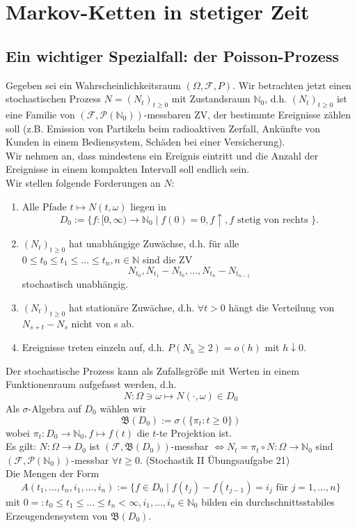 \documentclass[a4paper,twoside,DIV15,BCOR12mm]{scrbook}
\newcommand{\cF}{\mathcal F}
\newcommand{\borel}{{\mathfrak B}}
\begin{document}
\chapter{Markov-Ketten in stetiger Zeit}

\section{Ein wichtiger Spezialfall: der Poisson-Prozess}

Gegeben sei ein Wahrscheinlichkeitsraum $(\Omega,\cF,P)$.
Wir betrachten jetzt einen stochastischen Prozess $N=(N_t)_{t\geq 0}$
mit Zustandsraum $\mathbb{N}_0$, d.h. $(N_t)_{t\geq 0}$ ist eine Familie von
$(\cF,\mathcal{P}(\mathbb{N}_0))$-messbaren ZV, der bestimmte Ereignisse zählen soll
(z.B. Emission von Partikeln beim radioaktiven Zerfall, Ankünfte von Kunden in einem
Bediensystem, Schäden bei einer Versicherung). \\
Wir nehmen an, dass mindestens ein Ereignis eintritt und die Anzahl der Ereignisse in einem
kompakten Intervall soll endlich sein. \\
Wir stellen folgende Forderungen an $N$:
\begin{enumerate}[\hspace{1em}{(A}1)]
\item Alle Pfade $t \mapsto N(t,\omega)$ liegen in
\[
D_0:=\{f:[0,\infty)\longrightarrow\mathbb{N}_0\mid f(0)=0,f\uparrow,f \text{ stetig von rechts }\}.
\]
\item $(N_t)_{t\geq 0}$ hat unabhängige Zuwächse, d.h. für alle 
$0\leq t_0\leq t_1 \leq \dots \leq t_n, n\in \mathbb{N}$ sind die ZV
\[
N_{t_0},N_{t_1}-N_{t_0},\dots,N_{t_n}-N_{t_{n-1}}
\]
stochastisch unabhängig.
\item $(N_t)_{t\geq 0}$ hat stationäre Zuwächse, d.h. $\forall t>0$ hängt die Verteilung
von $N_{s+t}-N_s$ nicht von s ab.
\item Ereignisse treten einzeln auf, d.h. $P(N_h\geq2)=o(h)$ mit $h\downarrow 0$.
\end{enumerate}
\begin{bemerkung}
  Der stochastische Prozess kann als Zufallsgröße mit Werten in einem
  Funktionenraum aufgefasst werden, d.h.
  \[
  N:\Omega\ni\omega\mapsto N(\cdot,\omega)\in D_0
  \]
  Als $\sigma$-Algebra auf $D_0$ wählen wir 
  \[
  \borel(D_0):=\sigma(\{\pi_t:t\geq 0\})
  \]
  wobei $\pi_t:D_0\longrightarrow\mathbb{N}_0,f\mapsto f(t)$ die $t$-te Projektion ist. \\
  Es gilt: $N:\Omega\longrightarrow D_0$ ist $(\cF,\borel(D_0))$-messbar 
  $\Longleftrightarrow N_t=\pi_t \circ N:\Omega\longrightarrow\mathbb{N}_0$ sind 
  $(\cF,\mathcal P(\mathbb N_0))$-messbar $\forall t\geq0$. 
  (Stochastik II Übungsaufgabe 21) \\
  Die Mengen der Form
  \[
  A(t_1,\dots,t_n,i_1,\dots,i_n):=\{f\in D_0\mid f(t_j)-f(t_{j-1})=i_j \text{ für } j=1,\dots,n\}
  \]
  mit $0=:t_0\leq t_1\leq\dots\leq t_n<\infty,i_1,\dots,i_n\in\mathbb N_0$ 
  bilden ein durchschnittsstabiles Erzeugendensystem von $\borel(D_0)$.
\end{bemerkung}
\end{document}
